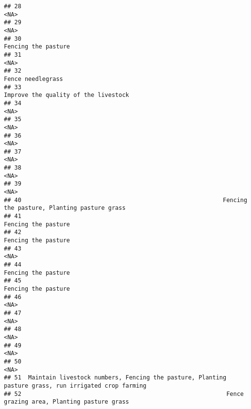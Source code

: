 \documentclass[
]{article}
\begin{document}
\begin{verbatim}
## 28                                                                                                 <NA>
## 29                                                                                                 <NA>
## 30                                                                                  Fencing the pasture
## 31                                                                                                 <NA>
## 32                                                                                    Fence needlegrass
## 33                                                                 Improve the quality of the livestock
## 34                                                                                                 <NA>
## 35                                                                                                 <NA>
## 36                                                                                                 <NA>
## 37                                                                                                 <NA>
## 38                                                                                                 <NA>
## 39                                                                                                 <NA>
## 40                                                          Fencing the pasture, Planting pasture grass
## 41                                                                                  Fencing the pasture
## 42                                                                                  Fencing the pasture
## 43                                                                                                 <NA>
## 44                                                                                  Fencing the pasture
## 45                                                                                  Fencing the pasture
## 46                                                                                                 <NA>
## 47                                                                                                 <NA>
## 48                                                                                                 <NA>
## 49                                                                                                 <NA>
## 50                                                                                                 <NA>
## 51  Maintain livestock numbers, Fencing the pasture, Planting pasture grass, run irrigated crop farming
## 52                                                           Fence grazing area, Planting pasture grass

\end{verbatim}
\end{document}
